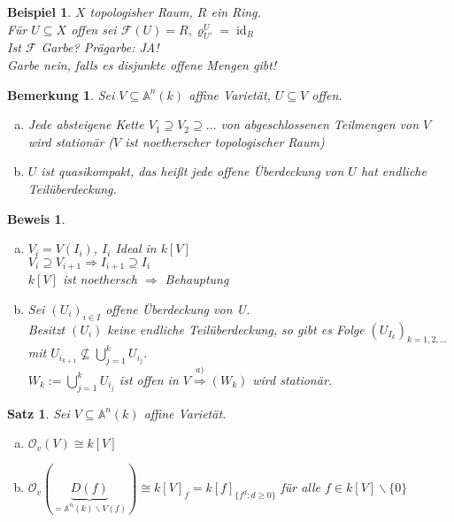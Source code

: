 \documentclass[a4paper,12pt]{report}
\theoremstyle{break}
\newtheorem{Satz}{Satz}
\newtheorem{Bem}[Def]{Bemerkung}
\theoremstyle{nonumberbreak}
\newtheorem{nnBsp}{Beispiel}
\newtheorem{Bew}{Beweis}
\theoremstyle{nonumberplain}
\newcommand{\quot}[1]{\textrm{\glqq}{#1}\textrm{\grqq}}
\DeclareMathOperator{\id}{id}
\newcommand{\A}{\mathbb{A}}
\begin{document}
\begin{nnBsp}
$X$ topologisher Raum, $R$ ein Ring.\\
F\"ur $U\subseteq X$ offen sei $\mathcal F(U)=R, \varrho^U_{U'}=\id_R$\\
Ist $\mathcal F$ Garbe? Pr\"agarbe: JA!\\
Garbe nein, falls es disjunkte offene Mengen gibt!
\end{nnBsp}

\begin{Bem}\label{7.5}\label{bem7.5}
Sei $V\subseteq \A^n(k)$ affine Variet\"at, $U\subseteq V$ offen.\begin{enumerate}[a)]
\item
	Jede absteigene Kette $V_1 \supseteq V_2 \supseteq \dots $ von abgeschlossenen Teilmengen von $V$ wird station\"ar (\quot{$V$ ist noetherscher topologischer Raum})
	
\item
	$U$ ist quasikompakt, das hei\ss t jede offene \"Uberdeckung von $U$ hat endliche Teil\"uberdeckung.
\end{enumerate}\end{Bem}

\begin{Bew}\begin{enumerate}[a)]
\item
$V_i=V(I_i)$, $I_i$ Ideal in $k[V]$\\
$V_i\supseteq V_{i+1} \Rightarrow I_{i+1} \supseteq I_i$\\
$k[V]$ ist noethersch $\Rightarrow $ Behauptung

\item\label{bem7.5b}
Sei $(U_i)_{i\in I}$ offene \"Uberdeckung von U.\\
Besitzt $(U_i)$ keine endliche Teil\"uberdeckung, so gibt es Folge $(U_{I_k})_{k=1,2,\dots }$ mit $U_{i_{k+1}} \nsubseteq \bigcup_{j=1}^k U_{i_j}.$\\
$W_k:= \bigcup_{j=1}^k U_{i_j}$ ist offen in $V \stackrel{a)}{\Rightarrow} (W_k)$ wird station\"ar.
\end{enumerate}\end{Bew}

\begin{Satz}\label{satz5}
Sei $V\subseteq\A^n(k)$ affine Variet\"at.\begin{enumerate}[a)]
\item\label{satz5a}
	$\mathcal O_v(V) \cong k[V]$

\item\label{satz5b}
	$\mathcal O_v(\underbrace{D(f)}_{=\A^n(k)\backslash V(f)}) \cong k[V]_f = k[f]_{\{f^d:d\ge 0\}}$
	f\"ur alle $f\in k[V]\backslash\{0\}$
\end{enumerate}\end{Satz}
\end{document}
